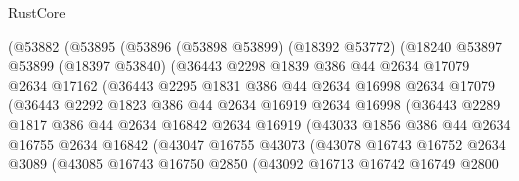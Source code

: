 \begin{lexlean}{RustCore}
\begin{coremodule}
                (@53882
                  (@53895
                    (@53896
                      (@53898 @53899)
                      (@18392 @53772)
                      (@18240
                        @53897
                        @53899
                        (@18397 @53840)
                        (@36443
                          @2298
                          @1839
                          @386
                          @44
                          @2634
                          @17079
                          @2634
                          @17162
                          (@36443
                            @2295
                            @1831
                            @386
                            @44
                            @2634
                            @16998
                            @2634
                            @17079
                            (@36443
                              @2292
                              @1823
                              @386
                              @44
                              @2634
                              @16919
                              @2634
                              @16998
                              (@36443
                                @2289
                                @1817
                                @386
                                @44
                                @2634
                                @16842
                                @2634
                                @16919
                                (@43033
                                  @1856
                                  @386
                                  @44
                                  @2634
                                  @16755
                                  @2634
                                  @16842
                                  (@43047
                                    @16755
                                    @43073
                                    (@43078
                                      @16743
                                      @16752
                                      @2634
                                      @3089
                                      (@43085
                                        @16743
                                        @16750
                                        @2850
                                        (@43092
                                          @16713
                                          @16742
                                          @16749
                                          @2800

\end{coremodule}
\end{lexlean}
